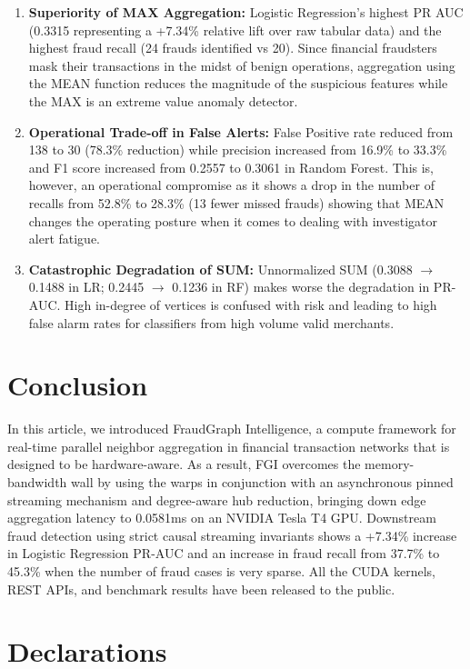 \documentclass[journal]{IEEEtran}
\begin{document}
\begin{enumerate}
    \item \textbf{Superiority of MAX Aggregation:} Logistic Regression's highest PR AUC (0.3315 representing a +7.34\% relative lift over raw tabular data) and the highest fraud recall (24 frauds identified vs 20). Since financial fraudsters mask their transactions in the midst of benign operations, aggregation using the MEAN function reduces the magnitude of the suspicious features while the MAX is an extreme value anomaly detector.
    \item \textbf{Operational Trade-off in False Alerts:} False Positive rate reduced from 138 to 30 (78.3\% reduction) while precision increased from 16.9\% to 33.3\% and F1 score increased from 0.2557 to 0.3061 in Random Forest. This is, however, an operational compromise as it shows a drop in the number of recalls from 52.8\% to 28.3\% (13 fewer missed frauds) showing that MEAN changes the operating posture when it comes to dealing with investigator alert fatigue.
    \item \textbf{Catastrophic Degradation of SUM:} Unnormalized SUM (0.3088 $\to$ 0.1488 in LR; 0.2445 $\to$ 0.1236 in RF) makes worse the degradation in PR-AUC. High in-degree of vertices is confused with risk and leading to high false alarm rates for classifiers from high volume valid merchants.
\end{enumerate}

\section{Conclusion}
In this article, we introduced FraudGraph Intelligence, a compute framework for real-time parallel neighbor aggregation in financial transaction networks that is designed to be hardware-aware. As a result, FGI overcomes the memory-bandwidth wall by using the warps in conjunction with an asynchronous pinned streaming mechanism and degree-aware hub reduction, bringing down edge aggregation latency to 0.0581ms on an NVIDIA Tesla T4 GPU. Downstream fraud detection using strict causal streaming invariants shows a +7.34\% increase in Logistic Regression PR-AUC and an increase in fraud recall from 37.7\% to 45.3\% when the number of fraud cases is very sparse. All the CUDA kernels, REST APIs, and benchmark results have been released to the public.

\section*{Declarations}
\end{document}
